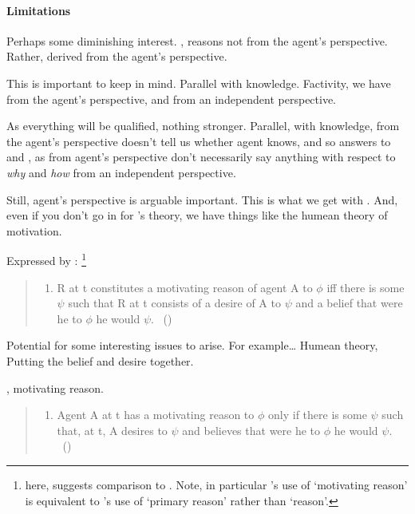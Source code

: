 \paragraph{Limitations}

\begin{note}
  Perhaps some diminishing interest.
  \citeauthor{Davidson:1963aa}, reasons not from the agent's perspective.
  Rather, derived from the agent's perspective.

  This is important to keep in mind.
  Parallel with knowledge.
  Factivity, we have from the agent's perspective, and from an independent perspective.

  As everything will be qualified, nothing stronger.
  Parallel, with knowledge, from the agent's perspective doesn't tell us whether agent knows, and so answers to \qWhy{} and \qHow{}, as from agent's perspective don't necessarily say anything with respect to \emph{why} and \emph{how} from an independent perspective.

  Still, agent's perspective is arguable important.
  This is what we get with \citeauthor{Davidson:1963aa}.
  And, even if you don't go in for \citeauthor{Davidson:1963aa}'s theory, we have things like the humean theory of motivation.

  Expressed by \citeauthor{Smith:1987vk}:%
  \footnote{
    \citeauthor{Smith:1987vk} here, suggests comparison to \textcite{Davidson:1963aa}.
    Note, in particular \citeauthor{Smith:1987vk}'s use of `motivating reason' is equivalent to \citeauthor{Davidson:1963aa}'s use of `primary reason' rather than `reason'.
  }
  \begin{quote}
    \begin{enumerate}[label=R1., ref=(R1)]
    \item
    R at t constitutes a motivating reason of agent A to \(\phi\) iff there is some \(\psi\) such that R at t consists of a desire of A to \(\psi\) and a belief that were he to \(\phi\) he would \(\psi\).%
    \mbox{ }\hfill\mbox{(\citeyear[36]{Smith:1987vk})}
  \end{enumerate}
\end{quote}

  Potential for some interesting issues to arise.
  For example\dots
  Humean theory, Putting the belief and desire together.

  \citeauthor{Smith:1987vk}, motivating reason.

  \begin{quote}
    \begin{enumerate}[label=R2., ref=(R2)]
    \item
      Agent A at t has a motivating reason to \(\phi\) only if there is some \(\psi\) such that, at t, A desires to \(\psi\) and believes that were he to \(\phi\) he would \(\psi\).%
      \mbox{ }\hfill\mbox{(\citeyear[36]{Smith:1987vk})}
    \end{enumerate}
  \end{quote}


\end{note}
